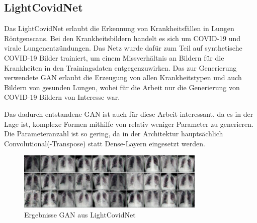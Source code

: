 \subsection{LightCovidNet}
Das LightCovidNet \cite{inspiration-dc-gan-med} erlaubt die Erkennung von Krankheitsfällen in Lungen Röntgenscans.
Bei den Krankheitsbildern handelt es sich um COVID-19 und virale Lungenentzündungen.
Das Netz wurde dafür zum Teil auf synthetische COVID-19 Bilder trainiert, um einem Missverhältnis an Bildern für die Krankheiten in den Trainingsdaten entgegenzuwirken.
Das zur Generierung verwendete GAN erlaubt die Erzeugung von allen Krankheitstypen und auch Bildern von gesunden Lungen, wobei für die Arbeit nur die Generierung von COVID-19 Bildern von Interesse war.
\newline

Das dadurch entstandene GAN ist auch für diese Arbeit interessant, da es in der Lage ist, komplexe Formen mithilfe von relativ weniger Parameter zu generieren.
Die Parameteranzahl ist so gering, da in der Architektur hauptsächlich Convolutional(-Transpose) statt Dense-Layern eingesetzt werden.

\begin{figure}[H]
	\centering
	\includegraphics[width=9cm]{kapitel/2_stand_der_technik/img/light-covid-net-ergebnisse.png}
	\caption{Ergebnisse GAN aus LightCovidNet \cite{inspiration-dc-gan-med}}
\end{figure}

